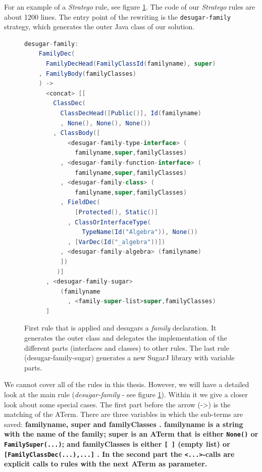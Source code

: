 \documentclass{report}
\begin{document}
For an example of a \emph{Stratego} rule, see figure \ref{exampleStrategoClassInterfaceTranslation}. The code of our \emph{Stratego} rules are about 1200 lines. The entry point of the rewriting is the \lstinline{desugar-family} strategy, which generates the outer Java class of our solution.

\begin{figure}[H]
\begin{lstlisting}[language=java,breaklines=false,morekeywords={familyname,super,familyClasses},keywordstyle=\bfseries\color{OliveGreen}]
  desugar-family:
    FamilyDec(
      FamilyDecHead(FamilyClassId(familyname), super)
    , FamilyBody(familyClasses)
    ) ->
      <concat> [[
        ClassDec(
          ClassDecHead([Public()], Id(familyname)
          , None(), None(), None())
        , ClassBody([
            <desugar-family-type-interface> (
              familyname,super,familyClasses)
          , <desugar-family-function-interface> (
              familyname,super,familyClasses)
          , <desugar-family-class> (
              familyname,super,familyClasses)
          , FieldDec(
              [Protected(), Static()]
            , ClassOrInterfaceType(
                TypeName(Id("Algebra")), None())
            , [VarDec(Id("_algebra"))])
          , <desugar-family-algebra> (familyname)
          ])
	     )]
      , <desugar-family-sugar>
          (familyname
            , <family-super-list>super,familyClasses)
      ]
\end{lstlisting}
\caption{First rule that is applied and desugars a \emph{family} declaration. It generates the outer class and delegates the implementation of the different parts (interfaces and classes) to other rules. The last rule (desugar-family-sugar) generates a new SugarJ library with variable parts.}
\label{exampleStrategoClassInterfaceTranslation}
\end{figure}

We cannot cover all of the rules in this thesis. However, we will have a detailed look at the main rule (\emph{desugar-family} - see figure \ref{exampleStrategoClassInterfaceTranslation}). Within it we give a closer look about some special cases. The first part before the arrow (-\textgreater) is the matching of the ATerm. There are three variables in which the sub-terms are saved: \bfseries familyname\mdseries, \bfseries super \mdseries and \bfseries familyClasses \mdseries. \bfseries familyname \mdseries is a string with the name of the family; \bfseries super \mdseries is an ATerm that is either \lstinline{None()} or \lstinline{FamilySuper(...)}; and \bfseries familyClasses \mdseries is either \lstinline{[ ]} (empty list) or \lstinline{[FamilyClassDec(...),...]} . In the second part the \lstinline{<...>}-calls are explicit calls to rules with the next ATerm as parameter.
\end{document}
